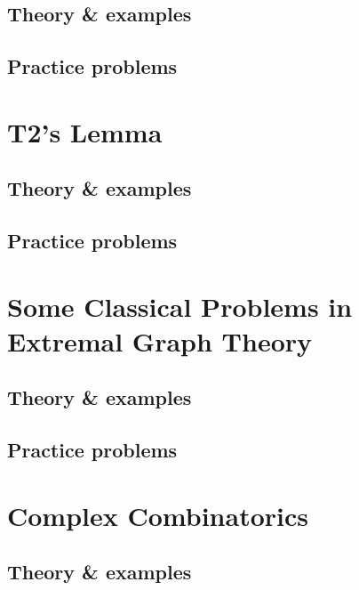 \documentclass[oneside]{book}
\numberwithin{equation}{section}
\begin{document}
\subsection{Theory \& examples}

\subsection{Practice problems}


\section{T2's Lemma}

\subsection{Theory \& examples}

\subsection{Practice problems}


\section{Some Classical Problems in Extremal Graph Theory}

\subsection{Theory \& examples}

\subsection{Practice problems}


\section{Complex Combinatorics}

\subsection{Theory \& examples}
\end{document}
